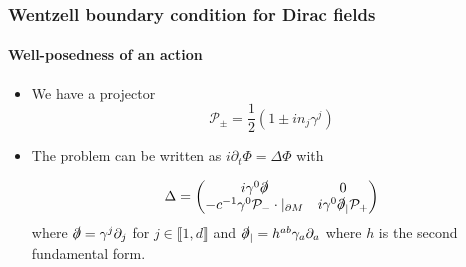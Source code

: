 \documentclass[french]{beamer}
\begin{document}
\begin{frame}
\frametitle{Wentzell boundary condition for Dirac fields}
\framesubtitle{Well-posedness of an action}

\begin{itemize}

\item We have a projector 
\begin{equation*}
\mathcal{P}_\pm = \frac{1}{2}(1 \pm i n_j\gamma^j) 
\end{equation*}

\item The problem can be written as $i\partial_t \Phi = \Delta \Phi$ with

\begin{equation*}
\Delta = \begin{pmatrix}
i \gamma^0 \slashed{\partial}  & 0 \\
-c^{-1} \gamma^0 \mathcal{P}_- \cdot \vert_{\partial M}&  i\gamma^0 \slashed{\partial}_| \mathcal{P}_+
\end{pmatrix}
\end{equation*}
where $\slashed{\partial} = \gamma^j\partial_j$ for
$j \in \llbracket 1 , d \rrbracket$ and $\slashed{\partial}_| = h^{ab} \gamma_{a} \partial_{a}$ where $h$ is the second fundamental form.

\end{itemize}

\end{frame}
\end{document}
